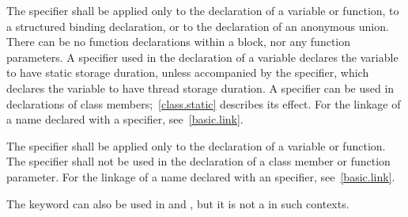 \pnum
{}%
The  specifier shall be applied only
to the declaration of a variable or function,
to a structured binding declaration, or
to the declaration of an anonymous union.
There can be no
 function declarations within a block, nor any
 function parameters. A  specifier used in
the declaration of a variable declares the variable to have static storage
duration, unless accompanied by the
 specifier, which declares the variable to have thread
storage duration. A  specifier can be
used in declarations of class members;~\ref{class.static} describes its
effect.
%
For the linkage of a name declared with a  specifier,
see~\ref{basic.link}.

\pnum
{}%
The  specifier shall be applied only to the declaration of a variable
or function. The  specifier shall not be used in the
declaration of a class member or function parameter.
%
%
For the linkage of a name declared with an  specifier,
see~\ref{basic.link}.
\begin{note}
The  keyword can also be used in
 and
, but it is not a
 in such contexts.
\end{note}


